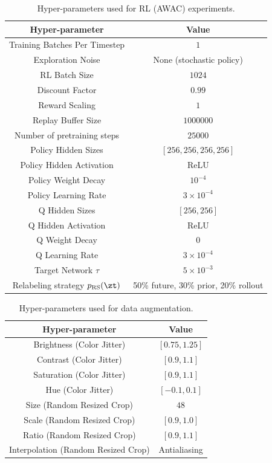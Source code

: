 \begin{table}[h!]
    \centering
    \begin{tabular}{c|c}
    \hline
    \textbf{Hyper-parameter} & \textbf{Value} \\
    \hline
    Training Batches Per Timestep & $1$\\
    Exploration Noise & None (stochastic policy) \\
    RL Batch Size & $1024$ \\
    Discount Factor & $0.99$\\
    Reward Scaling & $1$\\
    Replay Buffer Size & $1000000$\\
    Number of pretraining steps & $25000$ \\
    Policy Hidden Sizes & $[256, 256, 256, 256]$\\
    Policy Hidden Activation & ReLU\\
    Policy Weight Decay & $10^{-4}$ \\
    Policy Learning Rate & $3 \times 10^{-4}$\\
    Q Hidden Sizes & $[256, 256]$\\
    Q Hidden Activation & ReLU\\
    Q Weight Decay & $0$ \\
    Q Learning Rate & $3 \times 10^{-4}$\\
    Target Network $\tau$ & $5\times10^{-3}$ \\
    Relabeling strategy $p_\text{RS}(\zt)$ & 50\% future, 30\% prior, 20\% rollout \\
    \hline
    \end{tabular}
\caption{Hyper-parameters used for RL (AWAC) experiments.}
\label{table:awac-hyperparams}
\end{table}

\begin{table}[h!]
    \centering
    \begin{tabular}{c|c}
    \hline
    \textbf{Hyper-parameter} & \textbf{Value} \\
    \hline
    Brightness (Color Jitter) & $[0.75,1.25]$\\
    Contrast (Color Jitter) & $[0.9,1.1]$\\
    Saturation (Color Jitter) & $[0.9,1.1]$\\
    Hue (Color Jitter) & $[-0.1,0.1]$\\
    Size (Random Resized Crop) & $48$\\
    Scale (Random Resized Crop) & $[0.9, 1.0]$\\
    Ratio (Random Resized Crop) & $[0.9, 1.1]$\\
    Interpolation (Random Resized Crop) & Antialiasing\\
    \hline
    \end{tabular}
\caption{Hyper-parameters used for data augmentation.}
\label{table:data-hyperparams}
\end{table}

